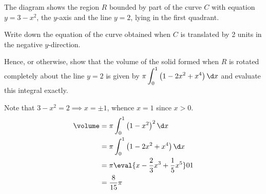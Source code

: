 \documentclass{jhwhw}
\begin{document}
    \problem{}
        The diagram shows the region $R$ bounded by part of the curve $C$ with equation $y = 3 - x^2$, the $y$-axis and the line $y = 2$, lying in the first quadrant.

        \begin{center}
        \end{center}

        Write down the equation of the curve obtained when $C$ is translated by 2 units in the negative $y$-direction.

        Hence, or otherwise, show that the volume of the solid formed when $R$ is rotated completely about the line $y = 2$ is given by $\pi \displaystyle\int_0^1 \left(1 - 2x^2 + x^4\right) \d x$ and evaluate this integral exactly.

    \solution

        Note that $3 - x^2 = 2 \implies x = \pm 1$, whence $x = 1$ since $x > 0$.
        \begin{align*}
            \volume &= \pi\int_0^1 \left(1 - x^2\right)^2 \d x\\
            &= \pi\int_0^1 \left(1 - 2x^2 + x^4\right) \d x\\
            &= \pi \eval{x - \dfrac23 x^3 + \dfrac15 x^5}01\\
            &= \dfrac{8}{15} \pi
        \end{align*}
\end{document}
